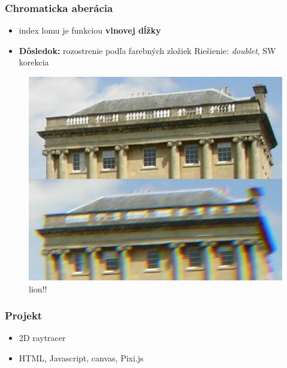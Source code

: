 \documentclass[10pt,xcolor=pdflatex]{beamer}
\begin{document}
\begin{frame}\frametitle{Chromaticka aberácia}
    \begin{itemize}
        \item index lomu je funkciou \textbf{vlnovej dĺžky}
        \item \textbf{Dôsledok:} rozostrenie podľa farebných zložiek
        Riešienie: \textit{doublet}, SW korekcia 
    \end{itemize}

    \begin{figure}
        \includegraphics[scale=0.4]{img/chromaticAberrationWikipedia.jpg}
        \caption{lion!!}
    \end{figure}
\end{frame}

\begin{frame}\frametitle{Projekt}
    \begin{itemize}
        \item 2D raytracer
        \item HTML, Javascript, canvas, Pixi.js
    \end{itemize}
\end{frame}

\end{document}
